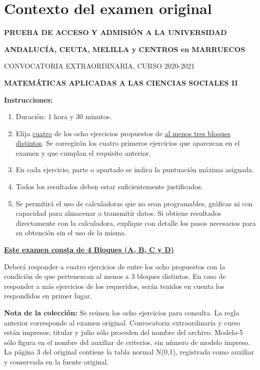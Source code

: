 \section*{Contexto del examen original}
\textbf{PRUEBA DE ACCESO Y ADMISIÓN A LA UNIVERSIDAD}\par
\textbf{ANDALUCÍA, CEUTA, MELILLA y CENTROS en MARRUECOS}\par
CONVOCATORIA EXTRAORDINARIA, CURSO 2020-2021\par
\textbf{MATEMÁTICAS APLICADAS A LAS CIENCIAS SOCIALES II}

\textbf{Instrucciones:}
\begin{enumerate}[label=\textbf{\alph*)}]
  \item Duración: 1 hora y 30 minutos.
  \item Elija \underline{cuatro} de los ocho ejercicios propuestos de
  \underline{al menos tres bloques distintos}. Se corregirán los cuatro
  primeros ejercicios que aparezcan en el examen y que cumplan el requisito
  anterior.
  \item En cada ejercicio, parte o apartado se indica la puntuación máxima
  asignada.
  \item Todos los resultados deben estar suficientemente justificados.
  \item Se permitirá el uso de calculadoras que no sean programables,
  gráficas ni con capacidad para almacenar o transmitir datos. Si obtiene
  resultados directamente con la calculadora, explique con detalle los pasos
  necesarios para su obtención sin el uso de la misma.
\end{enumerate}
\textbf{\underline{Este examen consta de 4 Bloques (A, B, C y D)}}\par
Deberá responder a cuatro ejercicios de entre los ocho propuestos con la
condición de que pertenezcan al menos a 3 bloques distintos. En caso de
responder a más ejercicios de los requeridos, serán tenidos en cuenta los
respondidos en primer lugar.

\noindent\textbf{Nota de la colección:} Se reúnen los ocho ejercicios para
consulta. La regla anterior corresponde al examen original. Convocatoria
extraordinaria y curso están impresos; titular y julio sólo proceden del nombre
del archivo. Modelo-5 sólo figura en el nombre del auxiliar de criterios,
sin número de modelo impreso. La página 3 del original contiene la tabla
normal N(0,1), registrada como auxiliar y conservada en la fuente original.
\par\medskip
